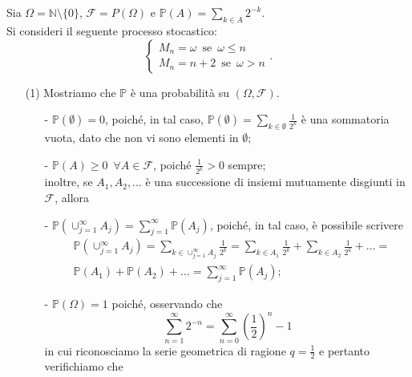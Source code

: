 \documentclass[11pt,largemargins]{homework}
\begin{document}
   \newpage
  \section{}%
  Sia $\Omega=\mathbb{N}\setminus \{0\}$, $\mathcal{F}=P\left(\Omega\right)$ e $\mathbb{P}\left(A\right)=\sum_{k\in A}2^{-k}$.\\
  Si consideri il seguente processo stocastico:
  \begin{equation*}
  \begin{cases} M_{n}=\omega \,\,\, \text{se} \,\,\, \omega\leq n\\M_{n}=n+2 \,\,\, \text{se} \,\,\, \omega> n\end{cases}.
  \end{equation*}
  
  \begin{enumerate}
  \item[(1)]
  Mostriamo che $\mathbb{P}$ è una probabilità su $\left(\Omega,\mathcal{F}\right)$.
  \begin{itemize}
  \item[-]
  $\mathbb{P}\left(\emptyset\right)=0$, poiché, in tal caso, $\mathbb{P}\left(\emptyset\right)=\sum_{k\in \emptyset}\frac{1}{2^{k}}$ è una sommatoria vuota, dato che non vi sono elementi in $\emptyset$;
  \item[-]
  $\mathbb{P}\left(A\right)\geq 0 \,\,\,\forall A\in \mathcal{F}$, poiché $\frac{1}{2^{k}}> 0$ sempre;\\
  inoltre, se $A_{1},A_{2},...$ è una successione di insiemi mutuamente disgiunti in $\mathcal{F}$, allora 
  \item[-]
  $\mathbb{P}\left(\cup_{j=1}^{\infty}A_{j}\right)=\sum_{j=1}^{\infty}\mathbb{P}\left(A_{j}\right)$, poiché, in tal caso, è possibile scrivere
  \begin{align*}
  &\mathbb{P}\left(\cup_{j=1}^{\infty}A_{j}\right)=\sum_{k\in\cup_{j=1}^{\infty}A_{j}}\frac{1}{2^{k}}=\sum_{k\in A_{1}}\frac{1}{2^{k}}+\sum_{k\in A_{2}}\frac{1}{2^{k}}+...=\\
  &\mathbb{P}\left(A_{1}\right)+\mathbb{P}\left(A_{2}\right)+...=\sum_{j=1}^{\infty}\mathbb{P}\left(A_{j}\right);
\end{align*}   
\item[-]
$\mathbb{P}\left(\Omega\right)=1$ poiché, osservando che
\begin{equation*}
\sum_{n=1}^{\infty}2^{-n}=\sum_{n=0}^{\infty}\left(\frac{1}{2}\right)^{n}-1
\end{equation*}
in cui riconosciamo la serie geometrica di ragione $q= \frac{1}{2}$ e pertanto verifichiamo che

\end{itemize}
\end{enumerate}
\end{document}

